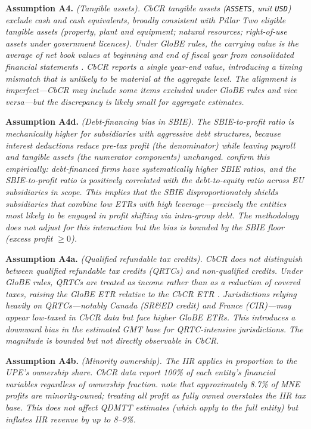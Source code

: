 \documentclass[11pt,a4paper]{article}
\newcommand{\code}[1]{\texttt{#1}}
\newcommand{\assumption}[2]{\noindent\textbf{Assumption #1.} \textit{#2}\medskip}
\begin{document}
\assumption{A4}{(Tangible assets). CbCR tangible assets (\code{ASSETS}, unit \code{USD}) exclude cash and cash equivalents, broadly consistent with Pillar Two eligible tangible assets (property, plant and equipment; natural resources; right-of-use assets under government licences). Under GloBE rules, the carrying value is the average of net book values at beginning and end of fiscal year from consolidated financial statements \citep{hanlon2023}. CbCR reports a single year-end value, introducing a timing mismatch that is unlikely to be material at the aggregate level. The alignment is imperfect---CbCR may include some items excluded under GloBE rules and vice versa---but the discrepancy is likely small for aggregate estimates.}

\assumption{A4d}{(Debt-financing bias in SBIE). The SBIE-to-profit ratio is mechanically higher for subsidiaries with aggressive debt structures, because interest deductions reduce pre-tax profit (the denominator) while leaving payroll and tangible assets (the numerator components) unchanged. \citet{devereux2023} confirm this empirically: debt-financed firms have systematically higher SBIE ratios, and the SBIE-to-profit ratio is positively correlated with the debt-to-equity ratio across EU subsidiaries in scope. This implies that the SBIE disproportionately shields subsidiaries that combine low ETRs with high leverage---precisely the entities most likely to be engaged in profit shifting via intra-group debt. The methodology does not adjust for this interaction but the bias is bounded by the SBIE floor (excess profit $\geq 0$).}

\assumption{A4a}{(Qualified refundable tax credits). CbCR does not distinguish between qualified refundable tax credits (QRTCs) and non-qualified credits. Under GloBE rules, QRTCs are treated as income rather than as a reduction of covered taxes, raising the GloBE ETR relative to the CbCR ETR \citep{liotti2022}. Jurisdictions relying heavily on QRTCs---notably Canada (SR\&ED credit) and France (CIR)---may appear low-taxed in CbCR data but face higher GloBE ETRs. This introduces a downward bias in the estimated GMT base for QRTC-intensive jurisdictions. The magnitude is bounded but not directly observable in CbCR.}

\assumption{A4b}{(Minority ownership). The IIR applies in proportion to the UPE's ownership share. CbCR data report 100\% of each entity's financial variables regardless of ownership fraction. \citet{barake2022} note that approximately 8.7\% of MNE profits are minority-owned; treating all profit as fully owned overstates the IIR tax base. This does not affect QDMTT estimates (which apply to the full entity) but inflates IIR revenue by up to 8--9\%.}
\end{document}
